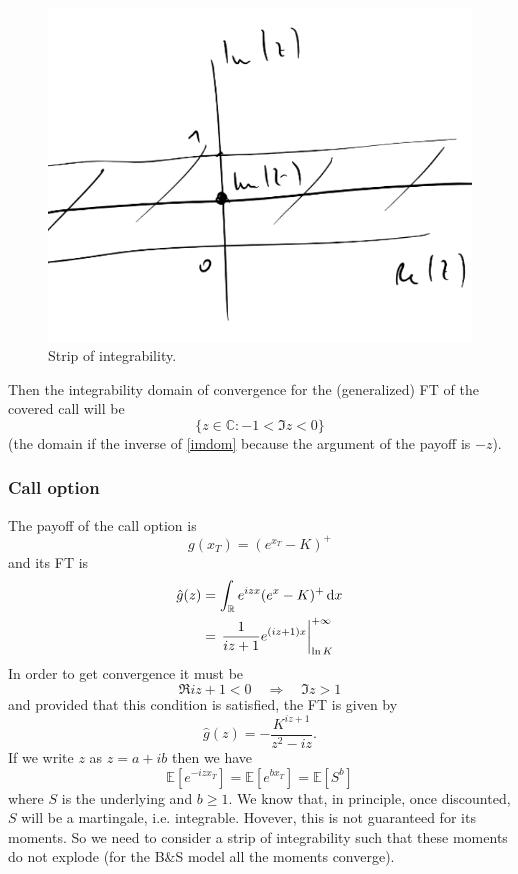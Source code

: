 \begin{figure}[h]
    \centering
    \includegraphics[scale=0.22]{fig/tmp/fig43}
    \caption{Strip of integrability.}
\end{figure}
Then the integrability domain of convergence for the (generalized) FT of the covered call will be
\begin{equation}
    \{z\in\mathbb{C}:-1<\Im{z}<0\}
\end{equation}
(the domain if the inverse of \eqref{imdom} because the argument of the payoff is $-z$).

\subsubsection{Call option}
The payoff of the call option is
\begin{equation}
    g(x_T) = (e^{x_T}-K)^+
\end{equation}
and its FT is
\begin{align}
    \notag\hat{g}(z) &= \int_{\mathbb{R}} e^{izx} (e^x-K)^+\,\dd x \\
    &=
    \eval{\frac{1}{iz+1}e^{(iz+1)x}}_{\ln K}^{+\infty}
\end{align}
In order to get convergence it must be
\begin{equation}
    \Re{iz+1} < 0 \quad\Rightarrow\quad \Im{z} > 1
\end{equation}
and provided that this condition is satisfied, the FT is given by
\begin{equation}
    \hat{g}(z) = -\frac{K^{iz+1}}{z^2-iz}.
\end{equation}
If we write $z$ as $z = a + ib$ then we have
\begin{equation*}
    \mathbb{E}[e^{-izx_T}] = \mathbb{E}[e^{bx_T}] = \mathbb{E}[S^b]
\end{equation*}
where $S$ is the underlying and $b\ge 1$. We know that, in principle, once discounted, $S$ will be a martingale, i.e. integrable. Hovever, this is not guaranteed for its moments. So we need to consider a strip of integrability such that these moments do not explode (for the B\&S model all the moments converge).

